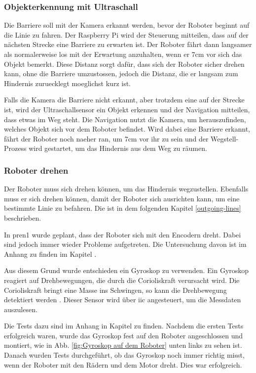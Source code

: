 \subsubsection{Objekterkennung mit Ultraschall}

Die Barriere soll mit der Kamera erkannt werden, bevor der Roboter beginnt auf die Linie zu fahren. Der Raspberry Pi wird der Steuerung mitteilen, dass auf der nächsten Strecke eine Barriere zu erwarten ist. Der Roboter fährt dann langsamer als normalerweise los mit der Erwartung anzuhalten, wenn er 7cm vor sich das Objekt bemerkt. Diese Distanz sorgt dafür, dass sich der Roboter sicher drehen kann, ohne die Barriere umzustossen, jedoch die Distanz, die er langsam zum Hindernis zuruecklegt moeglichst kurz ist.

Falls die Kamera die Barriere nicht erkannt, aber trotzdem eine auf der Strecke ist, wird der Ultraschallsensor ein Objekt erkennen und der Navigation mitteilen, dass etwas im Weg steht. Die Navigation nutzt die Kamera, um herauszufinden, welches Objekt sich vor dem Roboter befindet. Wird dabei eine Barriere erkannt, fährt der Roboter noch naeher ran, um 7cm vor ihr zu sein und der Wegstell-Prozess wird gestartet, um das Hindernis aus dem Weg zu räumen. 

\subsubsection{Roboter drehen}

Der Roboter muss sich drehen können, um das Hindernis wegzustellen. Ebenfalls muss er sich drehen können, damit der Roboter sich ausrichten kann, um eine bestimmte Linie zu befahren. Die ist in dem folgenden Kapitel \ref{outgoing-lines} beschrieben.

In \acrshort{pren1} wurde geplant, dass der Roboter sich mit den Encodern dreht. Dabei sind jedoch immer wieder Probleme aufgetreten. Die Untersuchung davon ist im Anhang zu finden im Kapitel .

Aus diesem Grund wurde entschieden ein Gyroskop zu verwenden.
 Ein Gyroskop reagiert auf Drehbewegungen, die durch die Corioliskraft verursacht wird. Die Corioliskraft bringt eine Masse ins Schwingen, so kann die Drehbewegung detektiert werden \parencite{zielke2025}. Dieser Sensor wird über \acrshort{iic} angesteuert, um die Messdaten auszulesen. 

Die Tests dazu sind im Anhang in Kapitel  zu finden. Nachdem die ersten Tests erfolgreich waren, wurde das Gyroskop fest auf den Roboter angeschlossen und montiert, wie in Abb. \ref{fig:Gyroskop auf dem Roboter} unten links zu sehen ist. Danach wurden Tests durchgeführt, ob das Gyroskop noch immer richtig misst, wenn der Roboter mit den Rädern und dem Motor dreht. Dies war erfolgreich.


